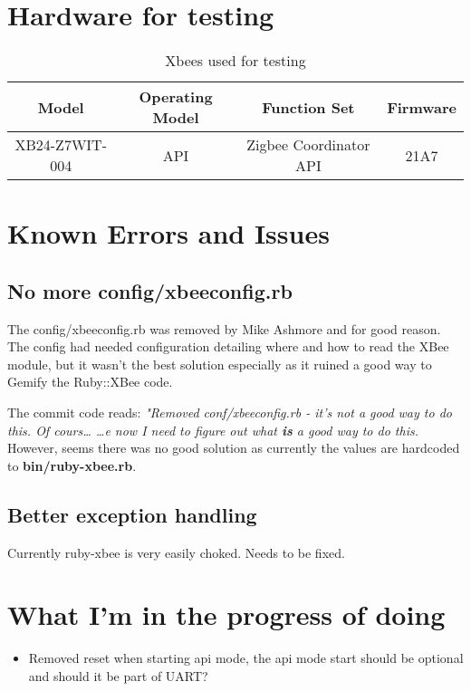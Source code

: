 \setlength{\parindent}{0pt}
\section{Hardware for testing}
\begin{table}[ht]
\caption{Xbees used for testing}
\centering
\begin{tabular}{c c c c}
\hline\hline
Model & Operating Model & Function Set & Firmware \\ [0.5ex] %
\hline
XB24-Z7WIT-004 & API & Zigbee Coordinator API & 21A7 \\ [1ex]
\hline
\end{tabular}
\label{table:nonlin}
\end{table}

\section{Known Errors and Issues}
\subsection{No more config/xbeeconfig.rb}
The config/xbeeconfig.rb was removed by Mike Ashmore and for good reason. The config had needed configuration detailing where and how to read the XBee module, but it wasn't the best solution especially as it ruined a good way to Gemify the Ruby::XBee code.

\noindent The commit code reads: \textit{"Removed conf/xbeeconfig.rb - it's not a good way to do this. Of cours… …e now I need to figure out what \textbf{is} a good way to do this.} However, seems there was no good solution as currently the values are hardcoded to \textbf{bin/ruby-xbee.rb}.

\subsection{Better exception handling}
Currently ruby-xbee is very easily choked. Needs to be fixed.

\section{What I'm in the progress of doing}
\begin{itemize}
\item Removed reset when starting api mode, the api mode start should be optional and should it be part of UART?
\end{itemize}